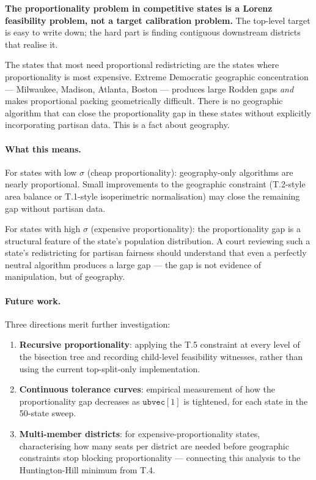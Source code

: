 \textbf{The proportionality problem in competitive states is a Lorenz feasibility
problem, not a target calibration problem.}
The top-level target is easy to write down; the hard part is finding contiguous
downstream districts that realise it.

The states that most need proportional redistricting are the states where
proportionality is most expensive.
Extreme Democratic geographic concentration --- Milwaukee, Madison, Atlanta,
Boston --- produces large Rodden gaps \emph{and} makes proportional packing
geometrically difficult.
There is no geographic algorithm that can close the proportionality gap
in these states without explicitly incorporating partisan data.
This is a fact about geography.

\paragraph{What this means.}
For states with low $\sigma$ (cheap proportionality): geography-only algorithms
are nearly proportional. Small improvements to the geographic constraint
(T.2-style area balance or T.1-style isoperimetric normalisation) may close
the remaining gap without partisan data.

For states with high $\sigma$ (expensive proportionality): the proportionality
gap is a structural feature of the state's population distribution.
A court reviewing such a state's redistricting for partisan fairness should
understand that even a perfectly neutral algorithm produces a large gap ---
the gap is not evidence of manipulation, but of geography.

\paragraph{Future work.}
Three directions merit further investigation:
\begin{enumerate}
\item \textbf{Recursive proportionality}: applying the T.5 constraint at
  every level of the bisection tree and recording child-level feasibility
  witnesses, rather than using the current top-split-only implementation.

\item \textbf{Continuous tolerance curves}: empirical measurement of how the
  proportionality gap decreases as $\mathtt{ubvec}[1]$ is tightened, for each
  state in the 50-state sweep.

\item \textbf{Multi-member districts}: for expensive-proportionality states,
  characterising how many seats per district are needed before geographic
  constraints stop blocking proportionality --- connecting this analysis to
  the Huntington-Hill minimum from T.4.
\end{enumerate}
